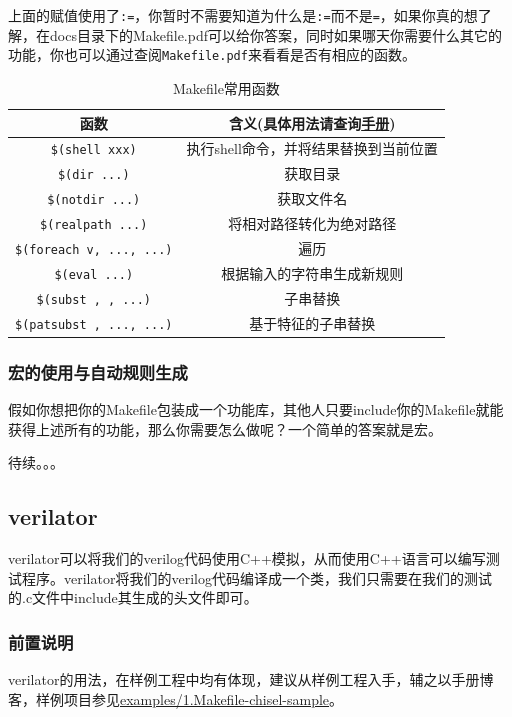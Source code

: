 \documentclass[lang=cn,11pt,a4paper]{elegantpaper}
\begin{document}
上面的赋值使用了\lstinline!:=!，你暂时不需要知道为什么是\lstinline!:=!而不是\lstinline!=!，如果你真的想了解，在docs目录下的Makefile.pdf可以给你答案，同时如果哪天你需要什么其它的功能，你也可以通过查阅\lstinline!Makefile.pdf!来看看是否有相应的函数。

\begin{table}[htbp]
\centering
\begin{tabular}{|c|c|}
\hline
函数&含义(具体用法请查询\href{run:../manuals/Makefile.pdf}{手册}) \\\hline
\lstinline|$(shell xxx)| & 执行shell命令，并将结果替换到当前位置 \\\hline
\lstinline|$(dir ...)| & 获取目录 \\\hline
\lstinline|$(notdir ...)| & 获取文件名 \\\hline
\lstinline|$(realpath ...)| & 将相对路径转化为绝对路径 \\\hline
\lstinline|$(foreach v, ..., ...)| & 遍历 \\\hline
\lstinline|$(eval ...)| & 根据输入的字符串生成新规则 \\\hline
\lstinline|$(subst , , ...)| & 子串替换 \\\hline
\lstinline|$(patsubst , ..., ...)| & 基于特征的子串替换 \\\hline
\end{tabular}
\caption{Makefile常用函数}
\end{table}

\subsubsection{宏的使用与自动规则生成}

假如你想把你的Makefile包装成一个功能库，其他人只要include你的Makefile就能获得上述所有的功能，那么你需要怎么做呢？一个简单的答案就是宏。

待续。。。

\subsection{verilator}\label{verilator}
verilator可以将我们的verilog代码使用C++模拟，从而使用C++语言可以编写测试程序。verilator将我们的verilog代码编译成一个类，我们只需要在我们的测试的.c文件中include其生成的头文件即可。

\subsubsection{前置说明}
verilator的用法，在样例工程中均有体现，建议从样例工程入手，辅之以手册博客，样例项目参见\href{run:../examples/1.Makefile-chisel-sample}{examples/1.Makefile-chisel-sample}。
\end{document}
